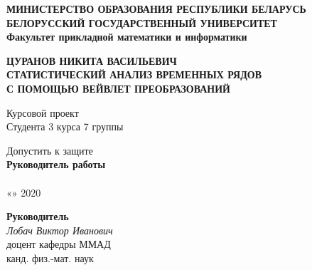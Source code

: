 \documentclass[a4paper]{article}
\begin{document}
	\begin{center}
		\textbf{
			МИНИСТЕРСТВО ОБРАЗОВАНИЯ РЕСПУБЛИКИ БЕЛАРУСЬ \\
			БЕЛОРУССКИЙ ГОСУДАРСТВЕННЫЙ УНИВЕРСИТЕТ \\
			Факультет прикладной математики и информатики
		} \\
		
		\vspace{1em}
		
	\end{center}
	
	\vspace{10em}
	
	\begin{center}
		\textbf{
			ЦУРАНОВ НИКИТА ВАСИЛЬЕВИЧ \\
			\vspace{1em}
			СТАТИСТИЧЕСКИЙ АНАЛИЗ ВРЕМЕННЫХ РЯДОВ \\
			С ПОМОЩЬЮ ВЕЙВЛЕТ ПРЕОБРАЗОВАНИЙ
		}
		
		\vspace{3em}
		Курсовой проект \\
		Студента 3 курса 7 группы
		
	\end{center}
	
	\vspace{10em}
	
	\begin{minipage}{0.4\textwidth}
		\begin{center}
			Допустить к защите \\
			\textbf{Руководитель работы} \\
			\underline{
				\qquad\qquad\qquad
				\qquad\qquad\quad
			} \\
			«\qquad»\underline{\qquad\qquad\qquad} 2020
		\end{center}
	\end{minipage}
	\hfill
	\begin{minipage}{0.4\textwidth}
		\begin{center}
			\textbf{Руководитель} \\
			\textit{Лобач Виктор Иванович} \\ 
			доцент кафедры ММАД \\ 
			канд. физ.-мат. наук
		\end{center}
	\end{minipage}
	
\end{document}
